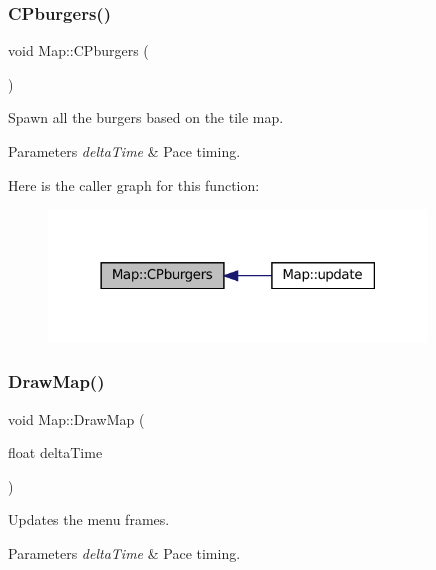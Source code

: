 \subsubsection{\texorpdfstring{C\+Pburgers()}{CPburgers()}}
{\footnotesize\ttfamily void Map\+::\+C\+Pburgers (\begin{DoxyParamCaption}{ }\end{DoxyParamCaption})}



Spawn all the burgers based on the tile map. 


\begin{DoxyParams}{Parameters}
{\em delta\+Time} & Pace timing. \\
\hline
\end{DoxyParams}
Here is the caller graph for this function\+:\nopagebreak
\begin{figure}[H]
\begin{center}
\leavevmode
\includegraphics[width=285pt]{classMap_a8485dce46ceae190bc9f51e22885eca3_icgraph}
\end{center}
\end{figure}
\mbox{\label{classMap_a3d0c3cf82f949ab01c788ab1c3e7f799}} 
\subsubsection{\texorpdfstring{Draw\+Map()}{DrawMap()}}
{\footnotesize\ttfamily void Map\+::\+Draw\+Map (\begin{DoxyParamCaption}\item[{float}]{delta\+Time }\end{DoxyParamCaption})}



Updates the menu frames. 


\begin{DoxyParams}{Parameters}
{\em delta\+Time} & Pace timing. \\
\hline
\end{DoxyParams}
\mbox{\label{classMap_af58f98cfacd972d950201cc25df95982}} 
